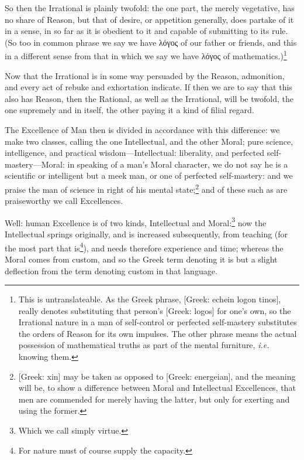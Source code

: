 So then the Irrational is plainly twofold: the one part, the merely vegetative,
has no share of Reason, but that of desire, or appetition generally, does
partake of it in a sense, in so far as it is obedient to it and capable of
submitting to its rule. (So too in common phrase we say we have
λόγος of our father or friends, and this in a
different sense from that in which we say we have
λόγος of mathematics.)\footnote{This is untranslateable. As the Greek phrase, [Greek: echein logon tinos],
really denotes substituting that person’s [Greek: logos] for one’s
own, so the Irrational nature in a man of self-control or perfected
self-mastery substitutes the orders of Reason for its own impulses. The other
phrase means the actual possession of mathematical truths as part of the mental
furniture, \emph{i.e.} knowing them.}

Now that the Irrational is in some way persuaded by the Reason, admonition, and
every act of rebuke and exhortation indicate. If then we are to say that this
also has Reason, then the Rational, as well as the Irrational, will be twofold,
the one supremely and in itself, the other paying it a kind of filial regard.

The Excellence of Man then is divided in accordance with this difference: we
make two classes, calling the one Intellectual, and the other Moral; pure
science, intelligence, and practical wisdom—Intellectual: liberality, and
perfected self-mastery—Moral: in speaking of a man’s Moral
character, we do not say he is a scientific or intelligent but a meek man, or
one of perfected self-mastery: and we praise the man of science in right of his
mental state;\footnote{[Greek: xin] may be taken as opposed to [Greek: energeian], and the meaning
will be, to show a difference between Moral and Intellectual Excellences, that
men are commended for merely having the latter, but only for exerting and using
the former.}
and of these such as are praiseworthy we call Excellences.



Well: human Excellence is of two kinds, Intellectual and Moral:\footnote{Which we call simply virtue.}
now the Intellectual springs originally, and is increased subsequently, from
teaching (for the most part that is\footnote{For nature must of course supply the capacity.}),
and needs therefore experience and time; whereas the Moral comes from custom,
and so the Greek term denoting it is but a slight deflection from the term
denoting custom in that language.

